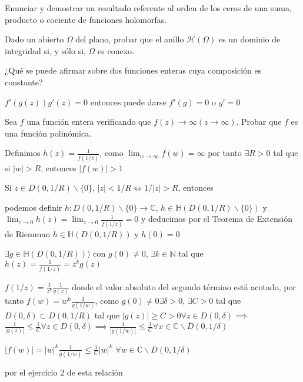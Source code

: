 \begin{ejer}
	Enunciar y demostrar un resultado referente al orden de los ceros de una suma, producto o cociente de funciones holomorfas.
\end{ejer}

\begin{ejer}
	Dado un abierto $\Omega$ del plano, probar que el anillo $\mathcal{H}(\Omega)$ es un dominio de integridad si, y sólo si, $\Omega$ es conexo.
\end{ejer}


\begin{ejer}
	¿Qué se puede afirmar sobre dos funciones enteras cuya composición es constante?
\end{ejer}
$f'(g(z)) g'(z) = 0 $
entonces puede darse
$f'(g)=0$ o $g'=0$


\begin{ejer}
	Sea $f$ una función entera verificando que $f(z)\rightarrow\infty (z\rightarrow\infty)$. Probar que $f$ es una función polinómica.
\end{ejer}
Definimos
$h(z) = \frac{1}{f(1/z)}$, como $\lim_{w\rightarrow\infty}f(w) = \infty$ por tanto $\exists R>0$ tal que si $|w|>R$, entonces $|f(w)|>1$

Si $z\in D(0,1/R)\backslash\{0\}$, $|z|<1/R \Longleftrightarrow 1/|z|>R$, entonces

podemos definir
$h : D(0,1/R)\backslash\{0\} \rightarrow \mathbb{C}$,
$h\in\mathbb{H}(D(0,1/R)\backslash\{0\})$ y $\lim_{z\rightarrow 0} h(z) = \lim_{z\rightarrow 0} \frac{1}{f(1/z)} = 0$
y deducimos por el Teorema de Extensión de Riemman
$h\in\mathbb{H}(D(0,1/R))$ y $h(0)=0$

$\exists g\in\mathbb{H}(D(0,1/R)))$ con $g(0) \not = 0$, $\exists k\in\mathbb{N}$ tal que $h(z) = \frac{1}{f(1/z)} = z^k g(z)$

$ f(1/z) = \frac{1}{z^k}\frac{1}{g(z)}$
donde el valor absoluto del segundo término está acotado, por tanto
$f(w) = w^k \frac{1}{g(1/w)}$,
como $g(0)\not = 0 \exists\delta>0$, $\exists C>0$ tal que $D(0,\delta)\subset D(0,1/R)$ tal que $|g(z)| \geq C > 0 \forall z\in D(0,\delta) \implies$
$\frac{1}{|g(z)|} \leq \frac{1}{C} \forall z\in D(0,\delta) \implies \frac{1}{|g(1/w)|} \leq \frac{1}{C} \forall x\in \mathbb{C}\backslash \overline{D}(0,1/\delta)$

$|f(w)| = |w|^k \frac{1}{g(1/w)} \leq \frac{1}{C}|w|^k$ $\forall w\in \mathbb{C}\backslash\overline{D}(0,1/\delta)$

por el ejercicio $2$ de esta relación

